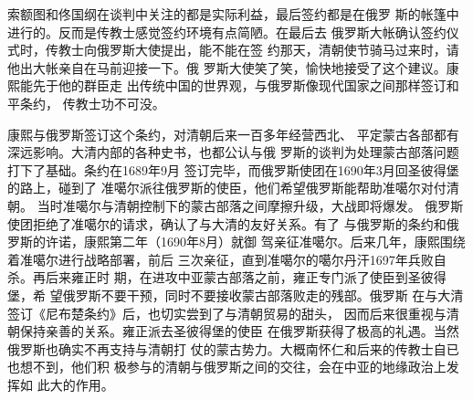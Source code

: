 索额图和佟国纲在谈判中关注的都是实际利益，最后签约都是在俄罗%
斯的帐篷中进行的。反而是传教士感觉签约环境有点简陋。在最后去%
俄罗斯大帐确认签约仪式时，传教士向俄罗斯大使提出，能不能在签%
约那天，清朝使节骑马过来时，请他出大帐亲自在马前迎接一下。俄%
罗斯大使笑了笑，愉快地接受了这个建议。康熙能先于他的群臣走%
出传统中国的世界观，与俄罗斯像现代国家之间那样签订和平条约，%
传教士功不可没。%
\par
康熙与俄罗斯签订这个条约，对清朝后来一百多年经营西北、%
平定蒙古各部都有深远影响。大清内部的各种史书，也都公认与俄%
罗斯的谈判为处理蒙古部落问题打下了基础。条约在1689年9月%
签订完毕，而俄罗斯使团在1690年3月回圣彼得堡的路上，碰到了%
准噶尔派往俄罗斯的使臣，他们希望俄罗斯能帮助准噶尔对付清朝。%
当时准噶尔与清朝控制下的蒙古部落之间摩擦升级，大战即将爆发。%
俄罗斯使团拒绝了准噶尔的请求，确认了与大清的友好关系。有了%
与俄罗斯的条约和俄罗斯的许诺，康熙第二年（1690年8月）就御%
驾亲征准噶尔。后来几年，康熙围绕着准噶尔进行战略部署，前后%
三次亲征，直到准噶尔的噶尔丹汗1697年兵败自杀。再后来雍正时%
期，在进攻中亚蒙古部落之前，雍正专门派了使臣到圣彼得堡，希%
望俄罗斯不要干预，同时不要接收蒙古部落败走的残部。俄罗斯%
在与大清签订《尼布楚条约》后，也切实尝到了与清朝贸易的甜头，%
因而后来很重视与清朝保持亲善的关系。雍正派去圣彼得堡的使臣%
在俄罗斯获得了极高的礼遇。当然俄罗斯也确实不再支持与清朝打%
仗的蒙古势力。大概南怀仁和后来的传教士自已也想不到，他们积%
极参与的清朝与俄罗斯之间的交往，会在中亚的地缘政治上发挥如%
此大的作用。%
